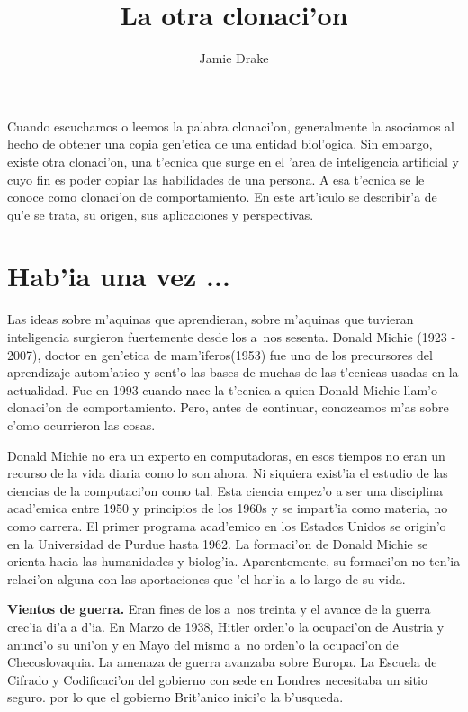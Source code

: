 \documentclass[11pt]{article}
\begin{document}
\title{La otra clonaci'on}
\author{Jamie Drake}

\maketitle
Cuando escuchamos o leemos la palabra clonaci'on, generalmente la asociamos al hecho de obtener una copia gen'etica de una entidad biol'ogica. Sin embargo, existe otra clonaci'on, una t'ecnica que surge en el 'area de inteligencia artificial y cuyo fin es poder copiar las habilidades de una persona. A esa t'ecnica se le conoce como clonaci'on de comportamiento. En este art'iculo se describir'a de qu'e se trata, su origen, sus aplicaciones y perspectivas.


\section{Hab'ia una vez ...}
Las ideas sobre m'aquinas que aprendieran, sobre m'aquinas que tuvieran inteligencia surgieron fuertemente desde los a~nos sesenta. Donald Michie (1923 - 2007), doctor en gen'etica de mam'iferos(1953) fue uno de los precursores del aprendizaje autom'atico y sent'o las bases de muchas de las t'ecnicas usadas en la actualidad. Fue en 1993 cuando nace la t'ecnica a quien Donald Michie llam'o clonaci'on de comportamiento. Pero, antes de continuar, conozcamos m'as sobre c'omo ocurrieron las cosas.

Donald Michie no era un experto en computadoras, en esos tiempos no eran un recurso de la vida diaria como lo son ahora. Ni siquiera exist'ia el estudio de las ciencias de la computaci'on  como tal. Esta ciencia empez'o a ser una disciplina acad'emica entre 1950 y principios de los 1960s y se impart'ia como materia, no como carrera. El primer programa acad'emico en los Estados Unidos se origin'o en la Universidad de Purdue hasta 1962. La formaci'on de Donald Michie se orienta hacia las humanidades y biolog'ia. Aparentemente, su formaci'on no ten'ia relaci'on alguna con las aportaciones que 'el har'ia a lo largo de su vida.

\medskip
\textbf{Vientos de guerra.} Eran fines de los a~nos treinta y el avance de la guerra crec'ia di'a a d'ia. En Marzo de 1938, Hitler orden'o la ocupaci'on de Austria y anunci'o su uni'on y en Mayo del mismo a~no orden'o la ocupaci'on de Checoslovaquia. La amenaza de guerra avanzaba sobre Europa. La Escuela de Cifrado y Codificaci'on del gobierno con sede en Londres necesitaba un sitio seguro. por lo que el gobierno Brit'anico inici'o la b'usqueda.
\end{document}
